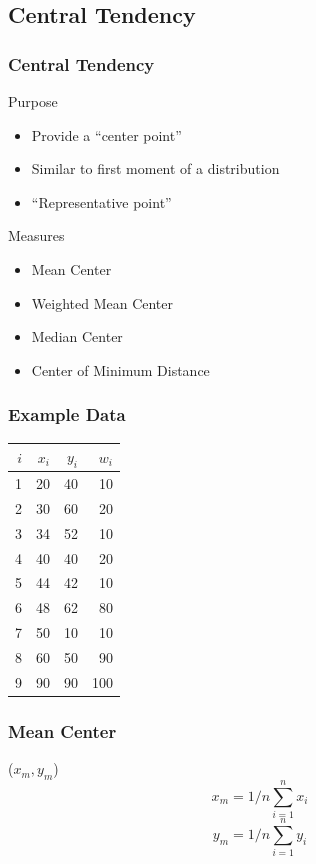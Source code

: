 \documentclass[nototal]{beamer}
\begin{document}
\subsection{Central Tendency}
\begin{frame}
  \frametitle{Central Tendency}
  \begin{block}{Purpose}
    \begin{itemize}
      \item Provide a ``center point''
      \item Similar to first moment of a distribution
      \item ``Representative point''
    \end{itemize}
   \end{block}
  \begin{block}{Measures}
    \begin{itemize}
      \item Mean Center
      \item Weighted Mean Center
      \item Median Center
      \item Center of Minimum Distance
    \end{itemize}
   \end{block}
 \end{frame}
 \begin{frame}
   \frametitle{Example Data}
   \begin{center}
   \begin{tabular}[h]{rrrr}
 $i$  &  $x_i$ & $y_i$ &  $w_i$ \\ \hline
1& 20& 40&  10\\
2& 30& 60&  20\\
3& 34& 52&  10\\
4& 40& 40&  20\\
5& 44& 42&  10\\
6& 48& 62&  80\\
7& 50& 10&  10\\
8& 60& 50&  90\\
9& 90& 90& 100\\
  \hline  
   \end{tabular}
 \end{center}
  \end{frame}
 \begin{frame}
   \frametitle{Mean Center}
   \begin{block}{($x_m,y_m$)}
     \begin{equation}
       x_m = 1/n \sum_{i=1}^n x_i
     \end{equation}
     \begin{equation}
       y_m = 1/n \sum_{i=1}^n y_i
     \end{equation}
    \end{block}
  \end{frame}
\end{document}
